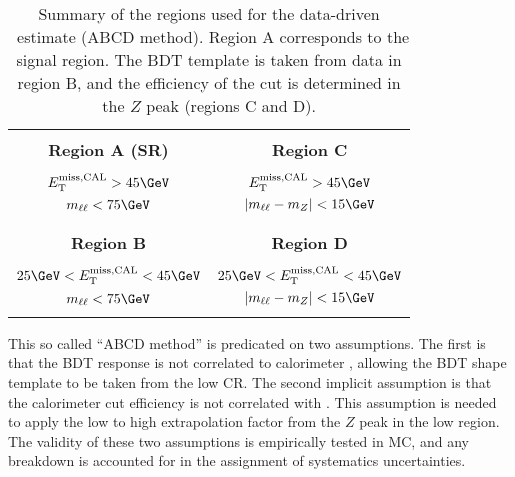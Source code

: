 \begin{table}
\centering
{\footnotesize
    \centering
    \begin{tabular}{|c||c|}
        \hline
        & \\
        \textbf{Region A (SR)}                          &
        \textbf{Region C }                           \\
        & \\
        $\calomet > 45 \GeV$                            & $\calomet >
        45 \GeV$                          \\
        $\mll < 75 \GeV$                                & $|\mll -
        m_Z| < 15 \GeV$              \\
        & \\
        \hline
        & \\
        \textbf{Region B}             & \textbf{Region D} \\
        & \\
        $25 \GeV < \calomet < 45 \GeV$          & $25 \GeV < \calomet
        < 45 \GeV$                        \\
        $\mll < 75 \GeV$                                & $|\mll -
        m_Z| < 15 \GeV$                      \\
        & \\
        \hline
    \end{tabular} }
\caption[Summary of the regions used for the data-driven \ZDY~estimate.]{Summary of the regions used for the data-driven
  \ZDY~estimate (ABCD method). Region A corresponds to the signal
  region. The BDT template is taken from data in region B, and the
  efficiency of the \calomet cut is determined in the $Z$ peak
  (regions C and D).}
\label{chap:analysis:tab:bdt_abcd_cartoon}
\end{table}

This so called ``ABCD method'' is predicated on two assumptions. The
first is that the BDT response is not correlated to calorimeter
\etmiss, allowing the BDT shape template to be taken from the low
\etmiss CR. The second implicit assumption is that the calorimeter
\etmiss cut efficiency is not correlated with \mll. This assumption
is needed to apply the low to high \etmiss extrapolation factor from
the $Z$ peak in the low \mll region. The validity of these two
assumptions is empirically tested in MC, and any breakdown is
accounted for in the assignment of systematics uncertainties. 

